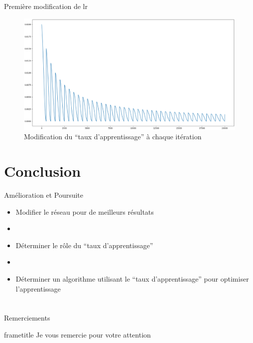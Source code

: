 \documentclass{beamer}
\begin{document}
\begin{frame}[t]{Première modification de lr}
  \begin{figure}
    \begin{center}
      \includegraphics[scale=0.17]{annex/lr_modification}
      \caption{Modification du ``taux d'apprentissage'' à chaque itération}
      \label{ModLR}
    \end{center}
  \end{figure}
\end{frame}

\section*{Conclusion}

\begin{frame}[t]{Amélioration et Poursuite}
  \begin{itemize}
    \item Modifier le réseau pour de meilleurs résultats
    \item[]
    \item Déterminer le rôle du ``taux d'apprentissage''
    \item[]
    \item Déterminer un algorithme utilisant le ``taux d'apprentissage'' pour optimiser l'apprentissage
  \end{itemize}
\end{frame}

\section*{}

\begin{frame}{Remerciements}
  \begin{beamercolorbox}[ht=2.5ex,dp=1.5ex,center]{frametitle}
    Je vous remercie pour votre attention
  \end{beamercolorbox}
\end{frame}
\end{document}
